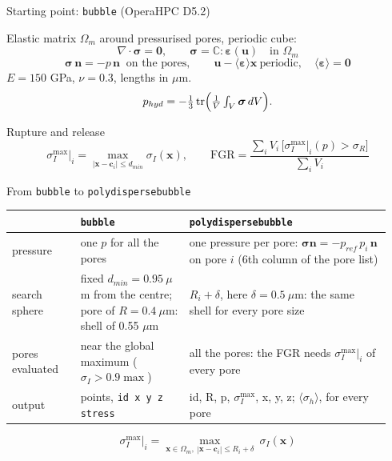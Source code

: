 \documentclass[10pt,aspectratio=169]{beamer}
\newcommand{\sI}{\sigma_I^{\max}\big|_i}
\newcommand{\code}[1]{\texttt{#1}}
\begin{document}
\begin{frame}{Starting point: \code{bubble} (OperaHPC D5.2)}

Elastic matrix $\Omega_m$ around pressurised pores, periodic cube:
\[
\nabla\cdot\boldsymbol\sigma=\mathbf 0,\qquad \boldsymbol\sigma=\mathbb C:\boldsymbol\varepsilon(\mathbf u)\quad\text{in }\Omega_m
\]
\[
\boldsymbol\sigma\,\mathbf n=-p\,\mathbf n\ \text{ on the pores},\qquad
\mathbf u-\langle\boldsymbol\varepsilon\rangle\mathbf x\ \text{periodic},\quad \langle\boldsymbol\varepsilon\rangle=\mathbf 0
\]
$E=150$ GPa, $\nu=0.3$, lengths in $\mu$m.
\[
p_{hyd}=-\tfrac13\,\mathrm{tr}\Bigl(\tfrac1V\textstyle\int_V\boldsymbol\sigma\,dV\Bigr).
\]

Rupture and release
\[
\sI=\max_{|\mathbf x-\mathbf c_i|\le d_{min}}\sigma_I(\mathbf x),\qquad
\mathrm{FGR}=\frac{\sum_i V_i\,\bigl[\sI(p)>\sigma_R\bigr]}{\sum_i V_i}
\]
\end{frame}

\begin{frame}{From \code{bubble} to \code{polydispersebubble}}
\renewcommand{\arraystretch}{1.25}
\begin{tabular}{@{}>{\raggedright\arraybackslash}p{0.17\linewidth}>{\raggedright\arraybackslash}p{0.27\linewidth}>{\raggedright\arraybackslash}p{0.50\linewidth}@{}}
\toprule
 & \code{bubble} & \code{polydispersebubble}\\
\midrule
pressure & one $p$ for all the pores & one pressure per pore: $\boldsymbol\sigma\mathbf n=-p_{ref}\,p_i\,\mathbf n$ on pore $i$ (6th column of the pore list) \\
search sphere & fixed $d_{min}=0.95\ \mu$m from the centre; pore of $R=0.4\ \mu$m: shell of 0.55 $\mu$m & $R_i+\delta$, here $\delta=0.5\ \mu$m: the same shell for every pore size\\
pores evaluated & near the global maximum ($\sigma_I>0.9\max$) & all the pores: the FGR needs $\sI$ of every pore \\
output & points, \code{id x y z stress} & id, R, p, $\sigma_I^{\max}$, x, y, z; $\langle\sigma_h\rangle$, for every pore \\
\bottomrule
\end{tabular}
\vspace{8pt}
\[
\sI=\max_{\mathbf x\in\Omega_m,\ |\mathbf x-\mathbf c_i|\le R_i+\delta}\ \sigma_I(\mathbf x)
\]
\end{frame}
\end{document}
